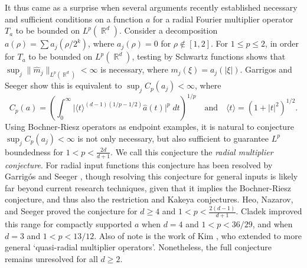 \documentclass[11pt]{article}
\DeclareMathOperator{\RR}{\mathbb{R}}
\begin{document}
It thus came as a surprise when several arguments \cites{GarrigosSeeger,HeoNazarovSeeger,Cladek,KimQuasiradial} recently established necessary and sufficient conditions on a function $a$ for a radial Fourier multiplier operator $T_a$ to be bounded on $L^p(\RR^d)$.
Consider a decomposition $a(\rho) = \sum a_j( \rho / 2^k)$, where $a_j(\rho) = 0$ for $\rho \not \in [1,2]$. For $1 \leq p \leq 2$, in order for $T_a$ to be bounded on $L^p(\RR^d)$, testing by Schwartz functions shows that $\sup_j \| \widehat{m}_j \|_{L^p(\RR^d)} < \infty$ is necessary, where $m_j(\xi) = a_j(|\xi|)$. Garrigos and Seeger \cite{GarrigosSeeger} show this is equivalent to $\sup_j C_p(a_j) < \infty$, where
%
\[ C_p(a) = \left( \int_0^\infty \big| \langle t \rangle^{(d-1)(1/p - 1/2)} \widehat{a}(t) \big|^p\; dt \right)^{1/p} \quad\text{and}\quad \langle t \rangle = (1 + |t|^2)^{1/2}. \] %
%
Using Bochner-Riesz operators as endpoint examples, it is natural to conjecture $\sup_j C_p(a_j) < \infty$ is not only necessary, but also sufficient to guarantee $L^p$ boundedness for $1 < p < {\scriptstyle \frac{2d}{d+1}}$. We call this conjecture the \emph{radial multiplier conjecture}. For radial input functions this conjecture has been resolved by Garrig\'{o}s and Seeger \cite{GarrigosSeeger}, though resolving this conjecture for general inputs is likely far beyond current research techniques, given that it implies the Bochner-Riesz conjecture, and thus also the restriction and Kakeya conjectures. Heo, Nazarov, and Seeger \cite{HeoNazarovSeeger} proved the conjecture for $d \geq 4$ and $1 < p < {\scriptstyle \frac{2(d-1)}{d+1}}$. Cladek \cite{Cladek} improved this range for compactly supported $a$ when $d = 4$ and $1 < p < 36/29$, and when $d = 3$ and $1 < p < 13/12$. Also of note is the work of Kim \cite{KimQuasiradial}, who extended \cite{HeoNazarovSeeger} to more general `quasi-radial multiplier operators'. Nonetheless, the full conjecture remains unresolved for all $d \geq 2$. %
\end{document}
